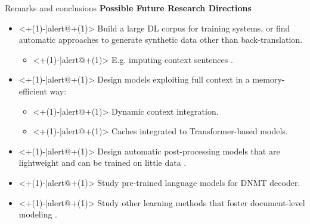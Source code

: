 \begin{frame}{Remarks and conclusions}
	\textbf{Possible Future Research Directions}
	\begin{itemize}
		\item<+(1)-|alert@+(1)> Build a large DL corpus for training systems, or find automatic approaches to generate synthetic data other than back-translation.
		\begin{itemize}
			\item<+(1)-|alert@+(1)> E.g. imputing context sentences \cite{jean_fill_2019}.
		\end{itemize}
		\item<+(1)-|alert@+(1)> Design models exploiting full context in a memory-efficient way:
		\begin{itemize}
			\item<+(1)-|alert@+(1)> Dynamic context integration.
			\item<+(1)-|alert@+(1)> Caches integrated to Transformer-based models.
		\end{itemize}
		\item<+(1)-|alert@+(1)> Design automatic post-processing models that are lightweight and can be trained on little data \cite{kim_when_2019}.
		\item<+(1)-|alert@+(1)> Study pre-trained language models for DNMT decoder.
		\item<+(1)-|alert@+(1)> Study other learning methods that foster document-level modeling \cite{jean_context-aware_2019}.
	\end{itemize}
\end{frame}